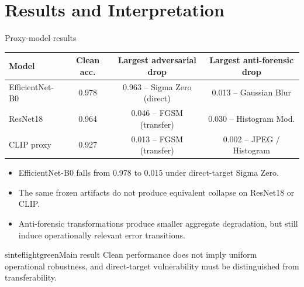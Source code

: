 \documentclass{beamer}
\begin{document}
\section{Results and Interpretation}

\begin{frame}{Proxy-model results}

\begin{table}
\centering
\scriptsize
\begin{tabular}{@{}lccc@{}}
\toprule
\textbf{Model} & \textbf{Clean acc.} & \textbf{Largest adversarial drop} & \textbf{Largest anti-forensic drop} \\
\midrule
EfficientNet-B0 & 0.978 & 0.963 -- Sigma Zero (direct) & 0.013 -- Gaussian Blur \\
ResNet18 & 0.964 & 0.046 -- FGSM (transfer) & 0.030 -- Histogram Mod. \\
CLIP proxy & 0.927 & 0.013 -- FGSM (transfer) & 0.002 -- JPEG / Histogram \\
\bottomrule
\end{tabular}
\end{table}

\begin{itemize}
    \item EfficientNet-B0 falls from 0.978 to 0.015 under direct-target Sigma Zero.
    \item The same frozen artifacts do not produce equivalent collapse on ResNet18 or CLIP.
    \item Anti-forensic transformations produce smaller aggregate degradation, but still induce operationally relevant error transitions.
\end{itemize}

\begin{colorblock}[black]{sinteflightgreen}{Main result}
Clean performance does not imply uniform operational robustness, and direct-target vulnerability must be distinguished from transferability.
\end{colorblock}

\end{frame}

\end{document}
